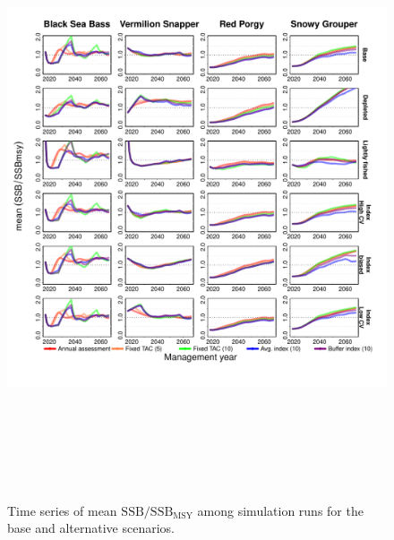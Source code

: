 \documentclass[12pt,english]{article}
\begin{document}
\begin{figure}[!ht]
\begin{center}
\includegraphics[width=6in,height=7in]{../Figs/tsSSBSSBmsy1.pdf}
\end{center}
\begin{flushleft}
\caption{Time series of mean $\mathrm{SSB/SSB_{MSY}}$ among simulation runs for the base and alternative scenarios. }
\label{fig:tsSSBSSBmsy1}
\end{flushleft}
\end{figure}
\end{document}
